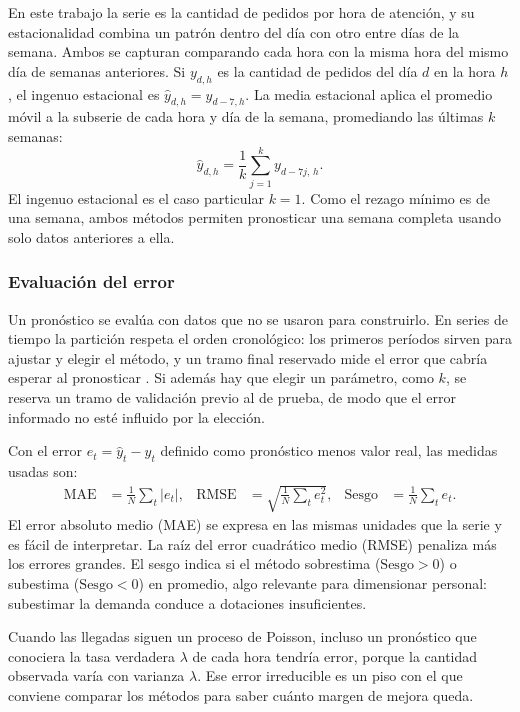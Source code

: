 En este trabajo la serie es la cantidad de pedidos por hora de atención, y su estacionalidad combina un patrón dentro del día con otro entre días de la semana.
Ambos se capturan comparando cada hora con la misma hora del mismo día de semanas anteriores.
Si $y_{d,h}$ es la cantidad de pedidos del día $d$ en la hora $h$, el ingenuo estacional es $\hat{y}_{d,h} = y_{d-7,h}$.
La media estacional aplica el promedio móvil a la subserie de cada hora y día de la semana, promediando las últimas $k$ semanas:
\begin{equation}
  \hat{y}_{d,h} = \frac{1}{k} \sum_{j=1}^{k} y_{d-7j,\,h}.
  \label{eq:media-estacional}
\end{equation}
El ingenuo estacional es el caso particular $k = 1$.
Como el rezago mínimo es de una semana, ambos métodos permiten pronosticar una semana completa usando solo datos anteriores a ella.

\subsubsection{Evaluación del error}
Un pronóstico se evalúa con datos que no se usaron para construirlo.
En series de tiempo la partición respeta el orden cronológico: los primeros períodos sirven para ajustar y elegir el método, y un tramo final reservado mide el error que cabría esperar al pronosticar \cite{hyndman_athanasopoulos_fpp3}.
Si además hay que elegir un parámetro, como $k$, se reserva un tramo de validación previo al de prueba, de modo que el error informado no esté influido por la elección.

Con el error $e_t = \hat{y}_t - y_t$ definido como pronóstico menos valor real, las medidas usadas son:
\begin{align}
  \mathrm{MAE} &= \frac{1}{N} \sum_{t} \lvert e_t \rvert, &
  \mathrm{RMSE} &= \sqrt{\frac{1}{N} \sum_{t} e_t^2}, &
  \mathrm{Sesgo} &= \frac{1}{N} \sum_{t} e_t .
\end{align}
El error absoluto medio (MAE) se expresa en las mismas unidades que la serie y es fácil de interpretar.
La raíz del error cuadrático medio (RMSE) penaliza más los errores grandes.
El sesgo indica si el método sobrestima ($\mathrm{Sesgo} > 0$) o subestima ($\mathrm{Sesgo} < 0$) en promedio, algo relevante para dimensionar personal: subestimar la demanda conduce a dotaciones insuficientes.

Cuando las llegadas siguen un proceso de Poisson, incluso un pronóstico que conociera la tasa verdadera $\lambda$ de cada hora tendría error, porque la cantidad observada varía con varianza $\lambda$.
Ese error irreducible es un piso con el que conviene comparar los métodos para saber cuánto margen de mejora queda.
